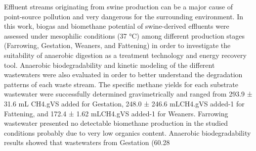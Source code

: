 Effluent streams originating from swine production can be a major cause of point-source pollution and very dangerous for the surrounding environment. In this work, biogas and biomethane potential of swine-derived effluents were assessed under mesophilic conditions (37 °C) among different production stages (Farrowing, Gestation, Weaners, and Fattening) in order to investigate the suitability of anaerobic digestion as a treatment technology and energy recovery tool. Anaerobic biodegradability and kinetic modeling of the different wastewaters were also evaluated in order to better understand the degradation patterns of each waste stream. The specific methane yields for each substrate wastewater were successfully determined gravimetrically and ranged from 293.9 ± 31.6 mL CH4.gVS added for Gestation, 248.0 ± 246.6 mLCH4.gVS added-1 for Fattening, and 172.4 ± 1.62 mLCH4.gVS added-1 for Weaners. Farrowing wastewater presented no detectable biomethane production in the studied conditions probably due to very low organics content.  Anaerobic biodegradability results showed that wastewaters from Gestation (60.28%